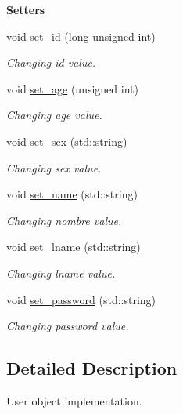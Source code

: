 \begin{Indent}{\bf Setters}\par
\begin{DoxyCompactItemize}
\item 
void \hyperlink{class_cuser_af24e3067528b741a49410b0372f4ef42}{set\+\_\+id} (long unsigned int)
\begin{DoxyCompactList}\small\item\em Changing id value. \end{DoxyCompactList}\item 
void \hyperlink{class_cuser_a21de7d9c58f6128adc959e2c008b7deb}{set\+\_\+age} (unsigned int)
\begin{DoxyCompactList}\small\item\em Changing age value. \end{DoxyCompactList}\item 
void \hyperlink{class_cuser_a5e3c1e2f75f9638714423f1372ea098a}{set\+\_\+sex} (std\+::string)
\begin{DoxyCompactList}\small\item\em Changing sex value. \end{DoxyCompactList}\item 
void \hyperlink{class_cuser_a54a15a99fc54cd882e87bb1ba66c3434}{set\+\_\+name} (std\+::string)
\begin{DoxyCompactList}\small\item\em Changing nombre value. \end{DoxyCompactList}\item 
void \hyperlink{class_cuser_a4062d5c81e4aafbb7ac0b9256df66b71}{set\+\_\+lname} (std\+::string)
\begin{DoxyCompactList}\small\item\em Changing lname value. \end{DoxyCompactList}\item 
void \hyperlink{class_cuser_ab1b88a55109edbfb16d6c05fc093fd1e}{set\+\_\+password} (std\+::string)
\begin{DoxyCompactList}\small\item\em Changing password value. \end{DoxyCompactList}\end{DoxyCompactItemize}
\end{Indent}


\subsection{Detailed Description}
User object implementation. 

